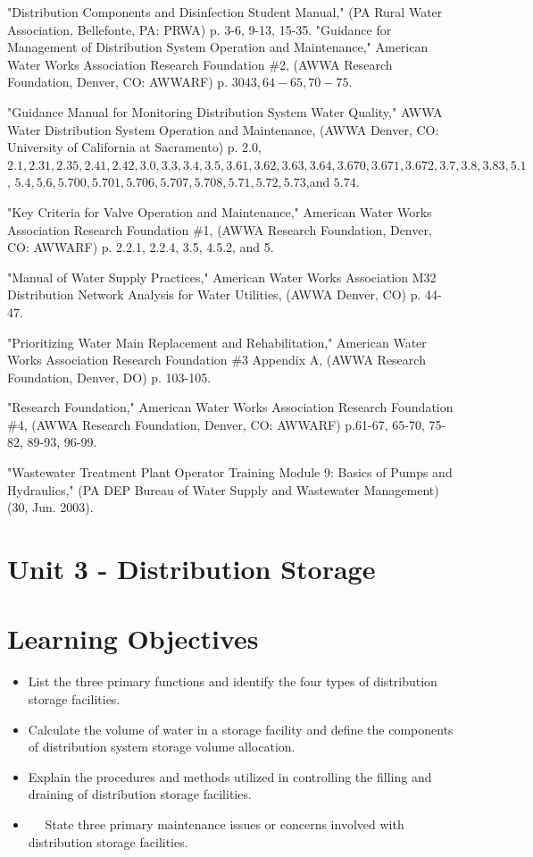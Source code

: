 \documentclass[10pt]{article}
\begin{document}
"Distribution Components and Disinfection Student Manual," (PA Rural Water Association, Bellefonte, PA: PRWA) p. 3-6, 9-13, 15-35. "Guidance for Management of Distribution System Operation and Maintenance," American Water Works Association Research Foundation \#2, (AWWA Research Foundation, Denver, CO: AWWARF) p. 30$43,64-65,70-75$.

"Guidance Manual for Monitoring Distribution System Water Quality," AWWA Water Distribution System Operation and Maintenance, (AWWA Denver, CO: University of California at Sacramento) p. 2.0, $2.1,2.31,2.35,2.41,2.42,3.0,3.3,3.4,3.5,3.61,3.62,3.63,3.64,3.670,3.671,3.672,3.7,3.8,3.83,5.1$, $5.4,5.6,5.700,5.701,5.706,5.707,5.708,5.71,5.72,5.73$,and $5.74$.

"Key Criteria for Valve Operation and Maintenance," American Water Works Association Research Foundation \#1, (AWWA Research Foundation, Denver, CO: AWWARF) p. 2.2.1, 2.2.4, 3.5, 4.5.2, and 5.

"Manual of Water Supply Practices," American Water Works Association M32 Distribution Network Analysis for Water Utilities, (AWWA Denver, CO) p. 44-47.

"Prioritizing Water Main Replacement and Rehabilitation," American Water Works Association Research Foundation \#3 Appendix A, (AWWA Research Foundation, Denver, DO) p. 103-105.

"Research Foundation," American Water Works Association Research Foundation \#4, (AWWA Research Foundation, Denver, CO: AWWARF) p.61-67, 65-70, 75-82, 89-93, 96-99.

"Wastewater Treatment Plant Operator Training Module 9: Basics of Pumps and Hydraulics," (PA DEP Bureau of Water Supply and Wastewater Management) (30, Jun. 2003).

\section{Unit 3 - Distribution Storage}
\section{Learning Objectives}
\begin{itemize}
  \item List the three primary functions and identify the four types of distribution storage facilities.

  \item Calculate the volume of water in a storage facility and define the components of distribution system storage volume allocation.

  \item Explain the procedures and methods utilized in controlling the filling and draining of distribution storage facilities.

  \item $\quad$ State three primary maintenance issues or concerns involved with distribution storage facilities.

\end{itemize}
\end{document}
